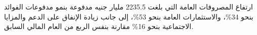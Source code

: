 ارتفاع المصروفات العامة التي بلغت 2235.5 مليار جنيه مدفوعة بنمو مدفوعات الفوائد بنحو 34\%، والاستثمارات العامة بنحو 53\%، إلى جانب زيادة الإنفاق على الدعم والمزايا الاجتماعية بنحو 16\% مقارنة بنفس الربع من العام المالي السابق.
